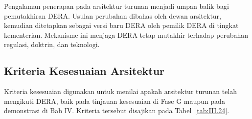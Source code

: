 Pengalaman penerapan pada arsitektur turunan menjadi umpan balik bagi pemutakhiran DERA. Usulan perubahan dibahas oleh dewan arsitektur, kemudian ditetapkan sebagai versi baru DERA oleh pemilik DERA di tingkat kementerian. Mekanisme ini menjaga DERA tetap mutakhir terhadap perubahan regulasi, doktrin, dan teknologi.

\subsection{Kriteria Kesesuaian Arsitektur}
\label{sec:III.5.4}

Kriteria kesesuaian digunakan untuk menilai apakah arsitektur turunan telah mengikuti DERA, baik pada tinjauan kesesuaian di Fase G maupun pada demonstrasi di Bab IV. Kriteria tersebut disajikan pada Tabel~\ref{tab:III.24}.

